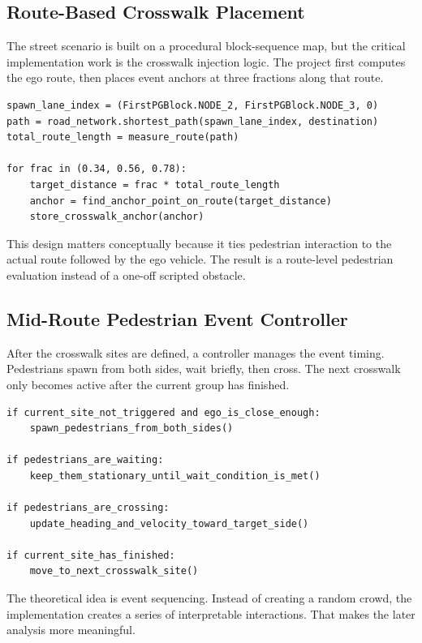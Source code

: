 \documentclass[12pt,a4paper]{report}
\begin{document}
\subsection{Route-Based Crosswalk Placement}
The street scenario is built on a procedural block-sequence map, but the critical implementation work is the crosswalk injection logic. The project first computes the ego route, then places event anchors at three fractions along that route.

\begin{lstlisting}[caption={Concept of the route-based crosswalk injection logic.},label={lst:crosswalk_injection},float=H]
spawn_lane_index = (FirstPGBlock.NODE_2, FirstPGBlock.NODE_3, 0)
path = road_network.shortest_path(spawn_lane_index, destination)
total_route_length = measure_route(path)

for frac in (0.34, 0.56, 0.78):
    target_distance = frac * total_route_length
    anchor = find_anchor_point_on_route(target_distance)
    store_crosswalk_anchor(anchor)
\end{lstlisting}

This design matters conceptually because it ties pedestrian interaction to the actual route followed by the ego vehicle. The result is a route-level pedestrian evaluation instead of a one-off scripted obstacle.

\subsection{Mid-Route Pedestrian Event Controller}
After the crosswalk sites are defined, a controller manages the event timing. Pedestrians spawn from both sides, wait briefly, then cross. The next crosswalk only becomes active after the current group has finished.

\begin{lstlisting}[caption={Simplified logic of the mid-route pedestrian event controller.},label={lst:ped_controller},float=H]
if current_site_not_triggered and ego_is_close_enough:
    spawn_pedestrians_from_both_sides()

if pedestrians_are_waiting:
    keep_them_stationary_until_wait_condition_is_met()

if pedestrians_are_crossing:
    update_heading_and_velocity_toward_target_side()

if current_site_has_finished:
    move_to_next_crosswalk_site()
\end{lstlisting}

The theoretical idea is event sequencing. Instead of creating a random crowd, the implementation creates a series of interpretable interactions. That makes the later analysis more meaningful.
\end{document}
